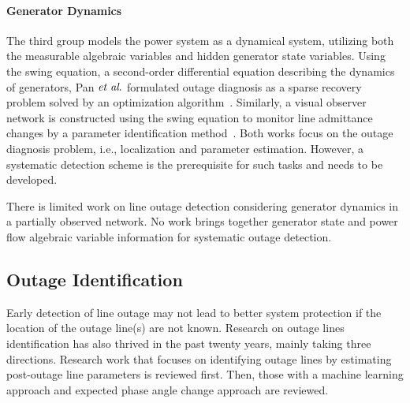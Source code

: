 \paragraph{Generator Dynamics}
The third group models the power system as a dynamical system, utilizing both the measurable algebraic variables and hidden generator state variables. Using the swing equation, a second-order differential equation describing the dynamics of generators, Pan $\textit{et al}.$ formulated outage diagnosis as a sparse recovery problem solved by an optimization algorithm~\cite{Pan2015a}. Similarly, a visual observer network is constructed using the swing equation to monitor line admittance changes by a parameter identification method~\cite{Yang2016b}. Both works focus on the outage diagnosis problem, i.e., localization and parameter estimation. However, a systematic detection scheme is the prerequisite for such tasks and needs to be developed.


There is limited work on line outage detection considering generator dynamics in a partially observed network. No work brings together generator state and power flow algebraic variable information for systematic outage detection.



\subsection{Outage Identification} %
\label{sub:outage_identification}
Early detection of line outage may not lead to better system protection if the location of the outage line(s) are not known. Research on outage lines identification has also thrived in the past twenty years, mainly taking three directions. Research work that focuses on identifying outage lines by estimating post-outage line parameters is reviewed first. Then, those with a machine learning approach and expected phase angle change approach are reviewed.

